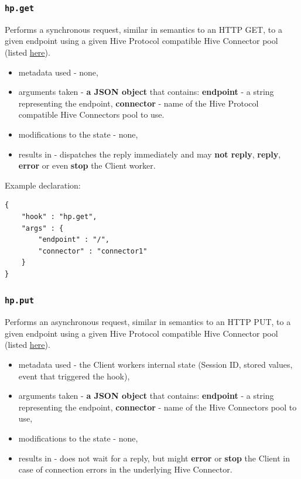 \documentclass[a4paper]{article}
\begin{document}
\subsubsection{\texttt{hp.get}}
\label{sec-9-2-8}
\label{ref-hive_protocol_hook}

Performs a synchronous request, similar in semantics to an HTTP GET, to a given endpoint using a given Hive Protocol compatible Hive Connector pool (listed \hyperref[ref-cp_connector]{here}).


\begin{itemize}
\item metadata used - none,
\item arguments taken - \textbf{a JSON object} that contains: \textbf{endpoint} - a string representing the endpoint, \textbf{connector} - name of the Hive Protocol compatible Hive Connectors pool to use.
\item modifications to the state - none,
\item results in - dispatches the reply immediately and may \textbf{not reply}, \textbf{reply}, \textbf{error} or even \textbf{stop} the Client worker.
\end{itemize}

\noindent
Example declaration:

\begin{verbatim}
{
    "hook" : "hp.get",
    "args" : {
        "endpoint" : "/",
        "connector" : "connector1"
    }
}
\end{verbatim}
\subsubsection{\texttt{hp.put}}
\label{sec-9-2-9}

Performs an asynchronous request, similar in semantics to an HTTP PUT, to a given endpoint using a given Hive Protocol compatible Hive Connector pool (listed \hyperref[ref-cp_connector]{here}).


\begin{itemize}
\item metadata used - the Client workers internal state (Session ID, stored values, event that triggered the hook),
\item arguments taken - \textbf{a JSON object} that contains: \textbf{endpoint} - a string representing the endpoint, \textbf{connector} - name of the Hive Connectors pool to use,
\item modifications to the state - none,
\item results in - does not wait for a reply, but might \textbf{error} or \textbf{stop} the Client in case of connection errors in the underlying Hive Connector.
\end{itemize}
\end{document}
